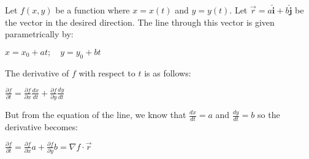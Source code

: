 \documentclass[12pt]{article}
\begin{document}
Let $f(x,y)$ be a function where $x=x(t)$ and $y=y(t)$.  Let $\vec{r}=a\hat{\mathbf{i}}+b\hat{\mathbf{j}}$ be the vector in the desired direction.  The line through this vector is given parametrically by:

\begin{center}$\displaystyle x=x_0+at;\quad y=y_0+bt$\end{center}

The derivative of $f$ with respect to $t$ is as follows:

\begin{center}$\displaystyle \frac{\partial f}{\partial t}=\frac{\partial f}{\partial x}\frac{dx}{dt}+\frac{\partial f}{\partial y}\frac{dy}{dt}$\end{center}

But from the equation of the line, we know that $\frac{dx}{dt}=a$ and $\frac{dy}{dt}=b$ so the derivative becomes:

\begin{center}$\displaystyle \frac{\partial f}{\partial t}=\frac{\partial f}{\partial x}a+\frac{\partial f}{\partial y}b=\nabla f\cdot\vec{r}$\end{center}
\end{document}
